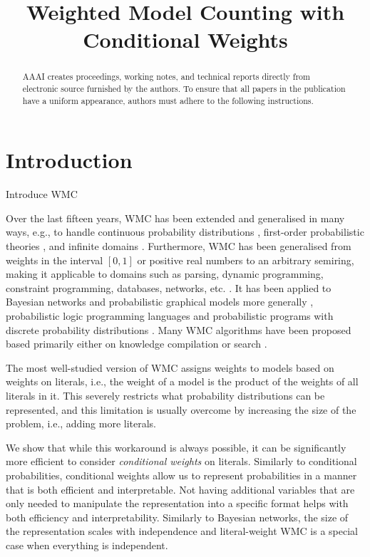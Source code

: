 \documentclass[letterpaper]{article} %
\title{Weighted Model Counting with Conditional Weights}
\theoremstyle{definition}
\theoremstyle{remark}
\begin{document}
\maketitle

\begin{abstract} %
  AAAI creates proceedings, working notes, and technical reports directly from
  electronic source furnished by the authors. To ensure that all papers in the
  publication have a uniform appearance, authors must adhere to the following
  instructions.
\end{abstract}

\section{Introduction}

Introduce WMC \cite{DBLP:conf/aaai/SangBK05}

Over the last fifteen years, WMC has been extended and generalised in many ways,
e.g., to handle continuous probability distributions
\cite{DBLP:conf/ijcai/BellePB15}, first-order probabilistic theories
\cite{DBLP:conf/ijcai/BroeckTMDR11,DBLP:journals/cacm/GogateD16}, and infinite
domains \cite{DBLP:conf/aaai/Belle17}. Furthermore, WMC has been generalised
from weights in the interval $[0, 1]$ or positive real numbers to an arbitrary
semiring, making it applicable to domains such as parsing, dynamic programming,
constraint programming, databases, networks, etc.
\cite{DBLP:journals/japll/KimmigBR17}. It has been applied to Bayesian networks
\cite{DBLP:conf/aaai/SangBK05,DBLP:books/daglib/0024906} and probabilistic
graphical models more generally \cite{DBLP:conf/ecsqaru/ChoiKD13}, probabilistic
logic programming languages \cite{DBLP:journals/tplp/FierensBRSGTJR15} and
probabilistic programs with discrete probability distributions
\cite{DBLP:journals/corr/abs-2005-09089}. Many WMC algorithms have been proposed
based primarily either on knowledge compilation
\cite{DBLP:conf/ecai/Darwiche04,DBLP:conf/ijcai/OztokD15,DBLP:conf/ijcai/LagniezM17}
or search \cite{DBLP:conf/aaai/SangBK05}.

The most well-studied version of WMC assigns weights to models based on
weights on literals, i.e., the weight of a model is the product of the weights
of all literals in it. This severely restricts what probability distributions
can be represented, and this limitation is usually overcome by increasing the
size of the problem, i.e., adding more literals.

We show that while this workaround is always possible, it can be significantly
more efficient to consider \emph{conditional weights} on literals. Similarly to
conditional probabilities, conditional weights allow us to represent
probabilities in a manner that is both efficient and interpretable. Not having
additional variables that are only needed to manipulate the representation into
a specific format helps with both efficiency and interpretability. Similarly to
Bayesian networks, the size of the representation scales with independence and
literal-weight WMC is a special case when everything is independent.
\end{document}
